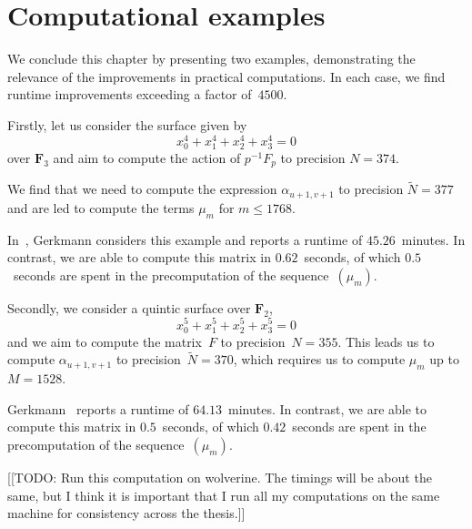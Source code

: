 
\section{Computational examples} 

We conclude this chapter by presenting two examples, demonstrating the 
relevance of the improvements in practical computations.  In each case, 
we find runtime improvements exceeding a factor of~$4500$.

Firstly, let us consider the surface given by 
\begin{equation*}
x_0^4 + x_1^4 + x_2^4 + x_3^4 = 0
\end{equation*}
over $\mathbf{F}_3$ and aim to compute the action of $p^{-1} F_p$ 
to precision $N = 374$.

We find that we need to compute the expression $\alpha_{u+1,v+1}$ to 
precision $\tilde{N} = 377$ and are led to compute the terms $\mu_m$ for 
$m \leq 1768$.

In~\citep[Section~7.4]{Gerkmann2007}, Gerkmann considers this example 
and reports a runtime of $45.26$~minutes.  In contrast, we are able 
to compute this matrix in $0.62$~seconds, of which $0.5$~seconds are 
spent in the precomputation of the sequence~$(\mu_m)$.

Secondly, we consider a quintic surface over $\mathbf{F}_2$, 
\begin{equation*}
x_0^5 + x_1^5 + x_2^5 + x_3^5 = 0
\end{equation*}
and we aim to compute the matrix~$F$ to precision~$N = 355$.  This leads 
us to compute $\alpha_{u+1,v+1}$ to precision~$\tilde{N} = 370$, which 
requires us to compute $\mu_{m}$ up to $M = 1528$.

Gerkmann~\citep[Section~7.6]{Gerkmann2007} reports a runtime of 
$64.13$~minutes.  In contrast, we are able to compute this matrix 
in $0.5$~seconds, of which $0.42$~seconds are spent in the precomputation 
of the sequence~$(\mu_m)$.

[[TODO:  Run this computation on wolverine.  The timings will be 
about the same, but I think it is important that I run all my 
computations on the same machine for consistency across the thesis.]]


